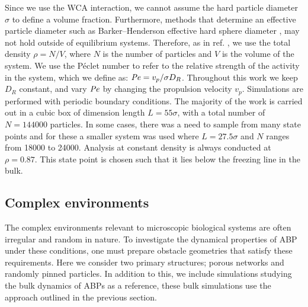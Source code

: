 Since we use the WCA interaction,
we cannot assume the hard particle diameter $\sigma$ to define a volume fraction. Furthermore, methods that determine an effective particle diameter such as Barker--Henderson effective hard sphere diameter \cite{barker1967}, may not hold outside of equilibrium systems. Therefore, as in ref. \cite{martin-roca2021}, we use the total density $\rho = N / V$, where $N$ is the number of particles and $V$ is the volume of the system.  
We use the P\'{e}clet number to refer to the relative strength of the activity in the system, which we define as: $\operatorname{\mathit{P\kern-.08em e}} = v_p/\sigma D_{R}$. Throughout this work we keep $D_R$ constant, and vary $\operatorname{\mathit{P\kern-.08em e}}$ by changing the propulsion velocity $v_p$. 
Simulations are performed with periodic boundary conditions. The majority of the work is carried out in a cubic box of dimension length $L = 55\sigma$, with a total number of $N = 144000$ particles. In some cases, there was a need to sample from many state points and for these a smaller system was used where $L = 27.5\sigma$ and $N$ ranges from 18000 to 24000. Analysis at constant density is always conducted at $\rho = 0.87$. This state point is chosen such that it lies below the freezing line in the bulk.
 

\subsection{Complex environments}
The complex environments relevant to microscopic biological systems are often irregular and random in nature. To investigate the dynamical properties of ABP under these conditions, one must prepare obstacle geometries that satisfy these requirements. Here we consider two primary structures; porous networks and randomly pinned particles. In addition to this, we include simulations studying the bulk dynamics of ABPs as a reference, these bulk simulations use the approach outlined in the previous section.

